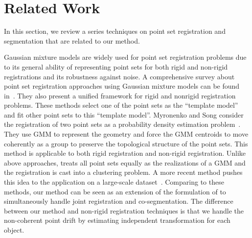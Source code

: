 \section{Related Work}
\label{sec:rw}
In this section, we review a series techniques on point set registration and segmentation that are related to our method. 

Gaussian mixture models are widely used for point set registration problems due to its general ability of representing point sets for both rigid and non-rigid registrations and its robustness against noise.
%
A comprehensive survey about point set registration approaches using Gaussian mixture models can be found in~\cite{GMM_PAMI}. 
They also present a unified framework for rigid and nonrigid registration problems. 
%
These methods select one of the point sets as the ``template model'' and fit other point sets to this ``template model''.
%
Myronenko and Song consider the registration of two point sets as a probability density estimation problem~\cite{CPD}.
They use GMM to represent the geometry and force the GMM centroids to move coherently as a group to preserve the topological structure of the point sets. 
This method is applicable to both rigid registration and non-rigid registration. 
%
%
Unlike above approaches, \cite{Evangelidis2014} treats all point sets equally as the realizations of a GMM and the registration is cast into a clustering problem. 
A more recent method pushes this idea to the application on a large-scale dataset~\cite{GOGMA}. 
Comparing to these methods, our method can be seen as an extension of the formulation of \cite{Evangelidis2014} to simultaneously handle joint registration and co-segmentation. The difference between our method and non-rigid registration techniques is that we handle the non-coherent point drift by estimating independent transformation for each object.
% 


